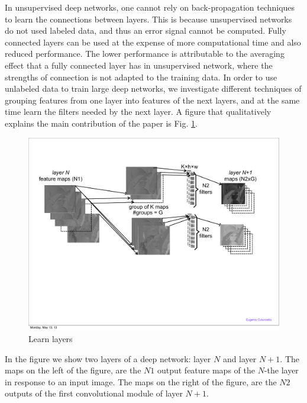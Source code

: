 \documentclass{article} %
\begin{document}
In unsupervised deep networks, one cannot rely on back-propagation techniques to learn the connections between layers. This is because unsupervised networks do not used labeled data, and thus an error signal cannot be computed. Fully connected layers can be used \cite{culurciello2013clustering,coates_analysis_2011} at the expense of more computational time and also reduced performance. The lower performance is attributable to the averaging effect that a fully connected layer has in unsupervised network, where the strengths of connection is not adapted to the training data. In order to use unlabeled data to train large deep networks, we investigate different techniques of grouping features from one layer into features of the next layers, and at the same time learn the filters needed by the next layer. A figure that qualitatively explains the main contribution of the paper is Fig. \ref{fig-learnlayers}.

\begin{figure}
\includegraphics[width=5in]{fig-learnlayers.pdf}
\caption{Learn layers}
\label{fig-learnlayers}
\end{figure}


In the figure we show two layers of a deep network: layer $N$ and layer $N+1$. The maps on the left of the figure, are the $N1$ output feature maps of the $N$-the layer in response to an input image. The maps on the right of the figure, are the $N2$ outputs of the first convolutional module of layer $N+1$. 
\end{document}
